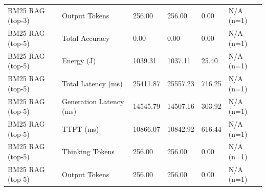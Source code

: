 \begin{table}
\begin{tabular}{llllll}
BM25 RAG (top-3) & Output Tokens & 256.00 & 256.00 & 0.00 & N/A (n=1) \\
BM25 RAG (top-5) & Total Accuracy & 0.00 & 0.00 & 0.00 & N/A (n=1) \\
BM25 RAG (top-5) & Energy (J) & 1039.31 & 1037.11 & 25.40 & N/A (n=1) \\
BM25 RAG (top-5) & Total Latency (ms) & 25411.87 & 25557.23 & 716.25 & N/A (n=1) \\
BM25 RAG (top-5) & Generation Latency (ms) & 14545.79 & 14507.16 & 303.92 & N/A (n=1) \\
BM25 RAG (top-5) & TTFT (ms) & 10866.07 & 10842.92 & 616.44 & N/A (n=1) \\
BM25 RAG (top-5) & Thinking Tokens & 256.00 & 256.00 & 0.00 & N/A (n=1) \\
BM25 RAG (top-5) & Output Tokens & 256.00 & 256.00 & 0.00 & N/A (n=1) \\
\bottomrule
\end{tabular}
\end{table}
